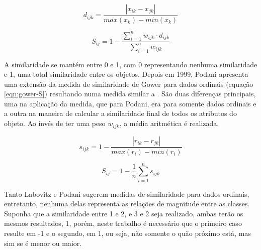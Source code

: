 \documentclass[preprint,12pt]{elsarticle}
\begin{document}
\begin{equation}
\label{eqn:all-data-distance}
    d_{ijk} =  \frac{|x_{ik} - x_{jk}|}{max(x_k) - min(x_k)}
\end{equation}

\begin{equation}
\label{eqn:all-data-sim}
    S_{ij} = 1 - \frac{\sum^n_{i=1} w_{ijk} \cdot d_{ijk}}{\sum^n_{i=1} w_{ijk}}
\end{equation}

A similaridade se mantém entre 0 e 1, com 0 representando nenhuma similaridade e 1, uma total similaridade entre os objetos. Depois em 1999, Podani \cite{extending-gower-ordinal} apresenta uma extensão da medida de similaridade de Gower para dados ordinais (equação \ref{eqn:gower-S}) resultando numa medida similar a \cite{analysis-cluster}. São duas diferenças principais, uma na aplicação da medida, que para Podani, era para somente dados ordinais e a outra na maneira de calcular a similaridade final de todos os atributos do objeto. Ao invés de ter uma peso $w_{ijk}$, a média aritmética é realizada.

\begin{equation}
\label{eqn:gower-s}
    s_{ijk} =  1 - \frac{|r_{ik} - r_{jk}|}{max(r_i) - min(r_i)}
\end{equation}

\begin{equation}
\label{eqn:gower-S}
    S_{ij} =  1 - \frac{1}{n}\sum^n_{i=1}s_{ijk}
\end{equation}

Tanto Labovitz e Podani sugerem medidas de similaridade para dados ordinais, entretanto, nenhuma delas representa as relações de magnitude entre as classes. Suponha que a similaridade entre 1 e 2, e 3 e 2 seja realizado, ambas terão os mesmos resultados, 1, porém, neste trabalho é necessário que o primeiro caso resulte em -1 e o segundo, em 1, ou seja, não somente o quão próximo está, mas sim se é menor ou maior.

\end{document}
